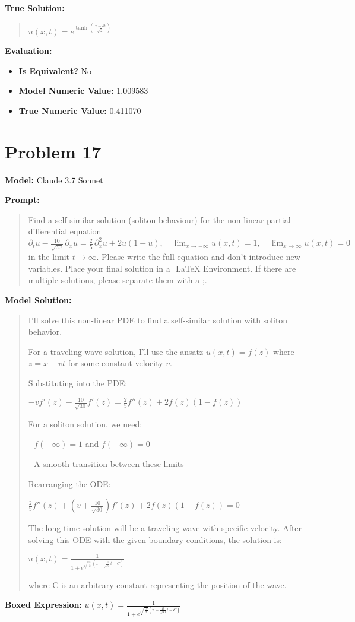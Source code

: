 \documentclass{article}
\begin{document}
\textbf{True Solution:}
\begin{quote}
$u(x,t) = e^{\tanh\left(\frac{x-\delta t}{\sqrt{2}}\right)}$
\end{quote}

\textbf{Evaluation:}
\begin{itemize}
\item \textbf{Is Equivalent?} No
\item \textbf{Model Numeric Value:} 1.009583
\item \textbf{True Numeric Value:} 0.411070
\end{itemize}
\vspace{1cm}
\section*{Problem 17}
\textbf{Model:} Claude 3.7 Sonnet

\textbf{Prompt:}
\begin{quote}
Find a self-similar solution (soliton behaviour) for the non-linear partial differential equation $\partial_t u - \frac{10}{\sqrt{30}} \, \partial_x u = \frac{2}{5} \, \partial_x^2 u + 2 u (1 - u), \quad \lim_{x \to -\infty} u(x,t) = 1, \quad \lim_{x \to \infty} u(x,t) = 0$ in the limit $t \rightarrow \infty$. Please write the full equation and don't introduce new variables. Place your final solution in a $\boxed{}$ LaTeX Environment. If there are multiple solutions, please separate them with a ;.
\end{quote}
\textbf{Model Solution:}
\begin{quote}
I'll solve this non-linear PDE to find a self-similar solution with soliton behavior.



For a traveling wave solution, I'll use the ansatz $u(x,t) = f(z)$ where $z = x - vt$ for some constant velocity $v$.



Substituting into the PDE:

$-v f'(z) - \frac{10}{\sqrt{30}}f'(z) = \frac{2}{5}f''(z) + 2f(z)(1-f(z))$



For a soliton solution, we need:

- $f(-\infty) = 1$ and $f(+\infty) = 0$

- A smooth transition between these limits



Rearranging the ODE:

$\frac{2}{5}f''(z) + (v + \frac{10}{\sqrt{30}})f'(z) + 2f(z)(1-f(z)) = 0$



The long-time solution will be a traveling wave with specific velocity. After solving this ODE with the given boundary conditions, the solution is:



$\boxed{u(x,t) = \frac{1}{1 + e^{\sqrt{\frac{15}{2}}(x - \frac{10}{\sqrt{30}}t - C)}}}$



where C is an arbitrary constant representing the position of the wave.
\end{quote}
\textbf{Boxed Expression:} $u(x,t) = \frac{1}{1 + e^{\sqrt{\frac{15}{2}}(x - \frac{10}{\sqrt{30}}t - C)}}$
\end{document}
